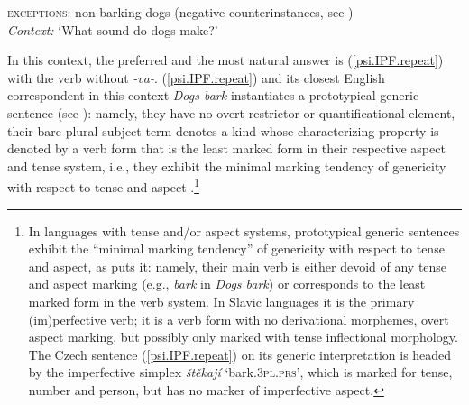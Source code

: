 \documentclass[output=paper,colorlinks,citecolor=brown]{langscibook}
\begin{document}
\eanoraggedright \label{exceptions.dog.sound}
\textsc{exceptions}: non-barking dogs (negative counterinstances, see \citealt{leslie2008})  \\
\textit{Context:} `What sound do dogs make?'
\z
\z

\noindent In this context, the preferred and the most natural answer is (\ref{psi.IPF.repeat}) with the verb without \textit{-va-}.
(\ref{psi.IPF.repeat}) and its closest English correspondent in this context \textit{Dogs bark} instantiates a prototypical generic sentence (see ): namely, they have no overt restrictor or quantificational element, their bare plural subject term denotes a kind whose characterizing property
is denoted by a verb form that is the least marked form in their respective aspect and tense system, i.e., they exhibit the minimal marking tendency of genericity with respect to tense and aspect \citep{dahl1995}.\footnote{In languages with tense and/or aspect systems, prototypical generic sentences
exhibit the ``minimal marking tendency'' of genericity
with respect to tense and aspect, as \citet{dahl1995} puts it: namely,
their main verb is either devoid of any tense and aspect marking
(e.g., \textit{bark} in \textit{Dogs bark})
or corresponds to the least marked form in the verb system.
In Slavic languages it is the primary (im)perfective verb; it is
a verb form with no derivational morphemes, overt aspect marking,
but possibly only marked with tense inflectional morphology. The Czech sentence (\ref{psi.IPF.repeat}) on its generic interpretation
is headed by the imperfective simplex \textit{štěkají} `bark.\textsc{3pl.prs}', which is marked for tense, number and person, but has no marker of imperfective aspect.}
\end{document}
